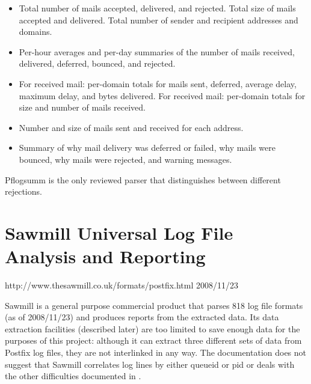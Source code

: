 \begin{itemize}

    \item Total number of mails accepted, delivered, and rejected.  Total
        size of mails accepted and delivered.  Total number of sender and
        recipient addresses and domains.

    \item Per-hour averages and per-day summaries of the number of mails
        received, delivered, deferred, bounced, and rejected.

    \item For received mail: per-domain totals for mails sent, deferred,
        average delay, maximum delay, and bytes delivered.  For received
        mail: per-domain totals for size and number of mails received.

    \item Number and size of mails sent and received for each address.

    \item Summary of why mail delivery was deferred or failed, why mails
        were bounced, why mails were rejected, and warning messages.

\end{itemize}

Pflogsumm is the only reviewed parser that distinguishes between different
rejections.

\section{Sawmill Universal Log File Analysis and Reporting}

{http://www.thesawmill.co.uk/formats/postfix.html}
{2008/11/23}

Sawmill is a general purpose commercial product that parses 818 log file
formats (as of 2008/11/23) and produces reports from the extracted data.
Its data extraction facilities (described later) are too limited to save
enough data for the purposes of this project: although it can extract three
different sets of data from Postfix log files, they are not interlinked in
any way.  The documentation does not suggest that Sawmill correlates log
lines by either queueid or pid or deals with the other difficulties
documented in .

